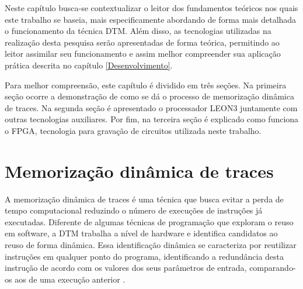 \label{Fundamentacao}
%
%
%

Neste capítulo busca-se contextualizar o leitor dos fundamentos teóricos nos quais este trabalho se baseia, mais especificamente abordando de forma mais detalhada o funcionamento da técnica DTM. Além disso, as tecnologias utilizadas na realização desta pesquisa serão apresentadas de forma teórica, permitindo ao leitor assimilar seu funcionamento e assim melhor compreender sua aplicação prática descrita no capítulo \ref{Desenvolvimento}.

Para melhor compreensão, este capítulo é dividido em três seções. Na primeira seção ocorre a demonstração de como se dá o processo de memorização dinâmica de traces. Na segunda seção é apresentado o processador LEON3 juntamente com outras tecnologias auxiliares. Por fim, na terceira seção é explicado como funciona o FPGA, tecnologia para gravação de circuitos utilizada neste trabalho.


\section{Memorização dinâmica de traces}
\label{Fundamentacao:DTM}

A memorização dinâmica de traces é uma técnica que busca evitar a perda de tempo computacional reduzindo o número de execuções de instruções já executadas. Diferente de algumas técnicas de programação que exploram o reuso em software, a DTM trabalha a nível de hardware e identifica candidatos ao reuso de forma dinâmica. Essa identificação dinâmica se caracteriza por reutilizar instruções em qualquer ponto do programa, identificando a redundância desta instrução de acordo com os valores dos seus parâmetros de entrada, comparando-os aos de uma execução anterior \cite{costa2001explorando}.




